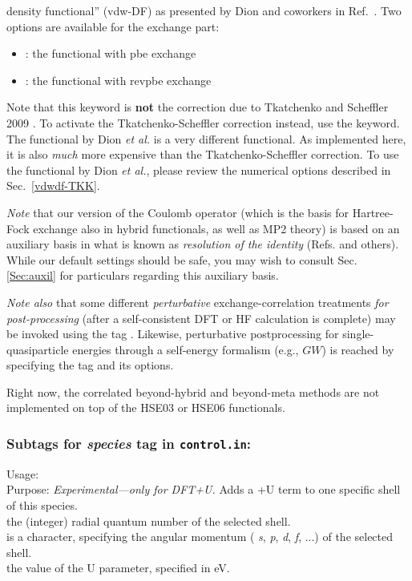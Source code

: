 \begin{itemize}
    density functional'' (vdw-DF) as presented by Dion and coworkers
    in Ref.~\cite{Dion04}. Two options are available for the exchange
    part:  
    \begin{itemize}
      \item {} : the functional with pbe exchange
      \item {} : the functional with revpbe exchange
    \end{itemize}
    Note that this keyword is \textbf{not} the correction due to
    Tkatchenko and Scheffler 2009 \cite{TS-vdw}. To activate the
    Tkatchenko-Scheffler correction instead, use the
     keyword. The functional by
    Dion \emph{et al.} is a very different functional. As implemented
    here, it is also \emph{much} more expensive than the
    Tkatchenko-Scheffler correction. To use the functional by Dion
    \emph{et al.}, please review the numerical options described in
    Sec.~\ref{vdwdf-TKK}. 
\end{itemize}
\emph{Note} that our version of the Coulomb operator (which is the basis for
Hartree-Fock exchange also in hybrid functionals, as well as MP2 theory) is
based on an auxiliary basis in what is known as \emph{resolution of the
  identity} (Refs. \cite{Boys59,Alsenoy88,Vahtras93,Eichkorn95} and
others). While our default settings should be safe, you may
wish to consult Sec. \ref{Sec:auxil} for particulars regarding this auxiliary
basis.

\emph{Note also} that some different \emph{perturbative} exchange-correlation
treatments \emph{for post-processing} (after a self-consistent DFT or HF
calculation is complete) may be invoked using the tag
. Likewise, perturbative postprocessing for
single-quasiparticle energies through a self-energy formalism (e.g., $GW$) is
reached by specifying the  tag and its options.

Right now, the correlated beyond-hybrid and beyond-meta methods are not
implemented on top of the HSE03 or HSE06 functionals.

\subsubsection*{Subtags for \emph{species} tag in \texttt{control.in}:}

{
  \noindent
  Usage:     \\[1.0ex]
  Purpose: \emph{Experimental---only for DFT+U.} Adds a +U term to one
    specific shell of this species. \\[1.0ex] 
   the (integer) radial quantum number of the selected shell. \\
   is a character, specifying the angular momentum (
    \emph{s}, \emph{p}, \emph{d}, \emph{f}, ...) of the selected shell. \\
   the value of the U parameter, specified in eV. \\
}

